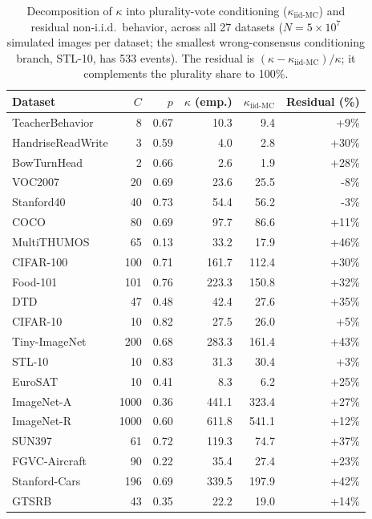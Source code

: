 \documentclass[a4paper,fleqn]{cas-sc}
\begin{document}
\begin{table}[h]
\centering
\caption{Decomposition of $\kappa$ into plurality-vote conditioning ($\kappa_{\text{iid-MC}}$) and residual non-i.i.d.\ behavior, across all 27 datasets ($N{=}5\times 10^7$ simulated images per dataset; the smallest wrong-consensus conditioning branch, STL-10, has 533 events). The residual is $(\kappa - \kappa_{\text{iid-MC}})/\kappa$; it complements the plurality share to 100\%.}
\label{tab:kappa_decomposition}
\small
\begin{tabular}{lrrrrr}
\toprule
Dataset & $C$ & $p$ & $\kappa$ (emp.) & $\kappa_{\text{iid-MC}}$ & Residual (\%) \\
\midrule
TeacherBehavior      & 8    & 0.67 & 10.3 & 9.4 & +9\% \\
HandriseReadWrite    & 3    & 0.59 & 4.0 & 2.8 & +30\% \\
BowTurnHead          & 2    & 0.66 & 2.6 & 1.9 & +28\% \\
VOC2007              & 20   & 0.69 & 23.6 & 25.5 & -8\% \\
Stanford40           & 40   & 0.73 & 54.4 & 56.2 & -3\% \\
COCO                 & 80   & 0.69 & 97.7 & 86.6 & +11\% \\
MultiTHUMOS          & 65   & 0.13 & 33.2 & 17.9 & +46\% \\
CIFAR-100            & 100  & 0.71 & 161.7 & 112.4 & +30\% \\
Food-101             & 101  & 0.76 & 223.3 & 150.8 & +32\% \\
DTD                  & 47   & 0.48 & 42.4 & 27.6 & +35\% \\
CIFAR-10             & 10   & 0.82 & 27.5 & 26.0 & +5\% \\
Tiny-ImageNet        & 200  & 0.68 & 283.3 & 161.4 & +43\% \\
STL-10               & 10   & 0.83 & 31.3 & 30.4 & +3\% \\
EuroSAT              & 10   & 0.41 & 8.3 & 6.2 & +25\% \\
ImageNet-A           & 1000 & 0.36 & 441.1 & 323.4 & +27\% \\
ImageNet-R           & 1000 & 0.60 & 611.8 & 541.1 & +12\% \\
SUN397               & 61   & 0.72 & 119.3 & 74.7 & +37\% \\
FGVC-Aircraft        & 90   & 0.22 & 35.4 & 27.4 & +23\% \\
Stanford-Cars        & 196  & 0.69 & 339.5 & 197.9 & +42\% \\
GTSRB                & 43   & 0.35 & 22.2 & 19.0 & +14\% \\

\end{tabular}
\end{table}
\end{document}
